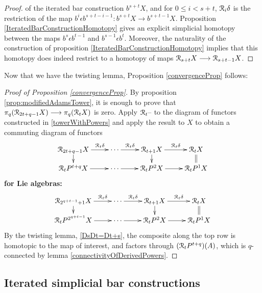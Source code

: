 \documentclass[11pt]{amsart}
\theoremstyle{plain}
\theoremstyle{definition}
\newcommand{\DASH}{\textup{--}}
\renewcommand{\to}{\longrightarrow}
\newcommand{\calR}{\mathcal{R}}
\theoremstyle{plain}
\newcommand{\caldup}[1]{\calR_{\smash{#1}}}
\newcommand{\barConstructionMightAbbreviate}{b}
\begin{document}
\begin{Bousfield-Kan spectral sequence}
\begin{proof}
of the iterated bar construction $\barConstructionMightAbbreviate^{s+t}X$, and for $0\leq i<s+t$, $\caldup{i}\delta$ is the restriction of the map $\barConstructionMightAbbreviate^i\epsilon \barConstructionMightAbbreviate^{s+t-i-1}:\barConstructionMightAbbreviate^{s+t}X\to \barConstructionMightAbbreviate^{s+t-1}X$.
Proposition \ref{IteratedBarConstructionHomotopy} gives an explicit simplicial homotopy between the maps $\barConstructionMightAbbreviate^s\epsilon \barConstructionMightAbbreviate^{t-1}$ and $\barConstructionMightAbbreviate^{s-1}\epsilon \barConstructionMightAbbreviate^{t}$. Moreover, the naturality of the construction of proposition \ref{IteratedBarConstructionHomotopy} implies that this homotopy does indeed restrict to a homotopy of maps $\caldup{s+t}X\to \caldup{s+t-1}X$.
\end{proof}


Now that we have the twisting lemma, Proposition \ref{convergenceProp} follows:
\begin{proof}[Proof of Proposition \ref{convergenceProp}]
By proposition \ref{prop:modifiedAdamsTower}, it is enough to prove that $\pi_q(\caldup{2t+q-1}X)\to\pi_q(\caldup{t}X)$ is zero.
Apply $\caldup{t}\DASH$ to the diagram of functors constructed in \ref{towerWithPowers} and apply the result to $X$ to obtain a commuting diagram of functors
\[\xymatrix@R=4mm{
\caldup{2t+q-1}X
\ar[r]^-{\caldup{t}\delta}
\ar[d]
&
\cdots \ar[r]^-{\caldup{t}\delta}
&%
\caldup{t+1}X
\ar[r]^-{\caldup{t}\delta}
\ar[d]&%
\caldup{t}X
\ar@{=}[d]
\\%
\caldup{t}P^{t+q}X
\ar[r]
&%
\cdots 
\ar[r]&%
\caldup{t}P^2X
\ar[r]
&%
\caldup{t}P^1X%
}\]\textbf{for Lie algebras:}
\[\xymatrix@R=4mm{
\caldup{2^{q+t-1}+1}X
\ar[r]^-{\caldup{t}\delta}
\ar[d]
&
\cdots \ar[r]^-{\caldup{t}\delta}
&%
\caldup{t+1}X
\ar[r]^-{\caldup{t}\delta}
\ar[d]&%
\caldup{t}X
\ar@{=}[d]
\\%
\caldup{t}P^{2^{q+t-1}}X
\ar[r]
&%
\cdots 
\ar[r]&%
\caldup{t}P^2X
\ar[r]
&%
\caldup{t}P^1X%
}\]
By the twisting lemma, \ref{DsDt=Dt+s}, the composite along the top row is homotopic to the map of interest, and factors through $(\caldup{t}P^{t+q})(A)$, which is $q$-connected by lemma \ref{connectivityOfDerivedPowers}.
\end{proof}

\subsection{Iterated simplicial bar constructions}\label{sec:ItSimpBar}



\end{Bousfield-Kan spectral sequence}
\end{document}
